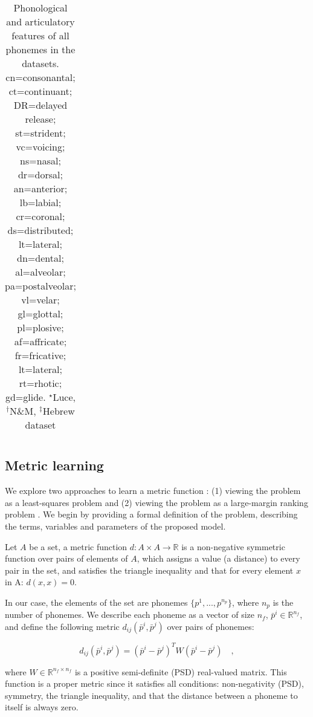 \begin{landscape}
\begin{table}[H]
\begin{tabular}{|c|c|c|c|c|c|c|c|c|c|c|c|c||c|c|c|c|c|c|c|c|c|c|c|c|c|c|}
\hline

\end{tabular}

\caption{Phonological and articulatory features of all phonemes in the datasets. cn=consonantal; ct=continuant; DR=delayed release; st=strident; vc=voicing; ns=nasal; dr=dorsal; an=anterior; lb=labial; cr=coronal; ds=distributed; lt=lateral; dn=dental; al=alveolar; pa=postalveolar; vl=velar; gl=glottal; pl=plosive; af=affricate; fr=fricative; lt=lateral; rt=rhotic; gd=glide. $^{\star}$Luce, $^{\dagger}$N\&M, $^{\ddagger}$Hebrew dataset}

\end{table}
\end{landscape}

\subsection{Metric learning}
We explore two approaches to learn a metric function \citep{Kulis2012}: (1) viewing the problem as a least-squares problem and (2) viewing the problem as a large-margin ranking problem \citep{Chechik2010}. We begin by providing a formal definition of the problem, describing the terms, variables and parameters of the proposed model.

Let $A$ be a set, a metric function $d: A \times A \to \mathbb{R}$ is a non-negative symmetric function over pairs of elements of $A$, which assigns a value (a distance) to every pair in the set, and satisfies the triangle inequality and that for every element $x$ in A: $d(x, x) = 0$.

In our case, the elements of the set are phonemes $\{p^1, ..., p^{n_p}\}$, where $n_p$ is the number of phonemes. We describe each phoneme as a vector of size $n_f$, $\bar{p}^i \in \mathbb{R} ^{n_f}$, and define the following metric $d_{ij}(\bar{p}^i, \bar{p}^j)$ over pairs of phonemes:

\begin{equation}
    d_{ij}(\bar{p}^i, \bar{p}^j) = (\bar{p}^i - \bar{p}^j)^T W (\bar{p}^i - \bar{p}^j) \quad ,
\end{equation}

where $W \in \mathbb{R} ^{n_f \times n_f}$ is a positive semi-definite (PSD) real-valued matrix. This function is a proper metric since it satisfies all conditions: non-negativity (PSD), symmetry, the triangle inequality, and that the distance between a phoneme to itself is always zero. 

